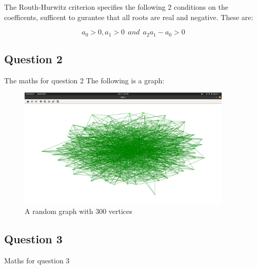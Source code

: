 \documentclass{article}
\begin{document}
The Routh-Hurwitz criterion specifies the following 2 conditions on the coefficents,
sufficent to gurantee that all roots are real and negative. These are:

$$a_{0} > 0, a_{1} > 0 ~~ and ~~ a_{2}a_{1} - a_{0} > 0$$


\subsection*{Question 2}
The maths for question 2
The following is a graph:

\begin{figure}[h]
\centering
\includegraphics[width = 4in]{Screenshot from 2021-10-17 21-43-29.png}
\caption{A random graph with 300 vertices}
\end{figure}


\subsection*{Question 3}
Maths for question 3
\end{document}
